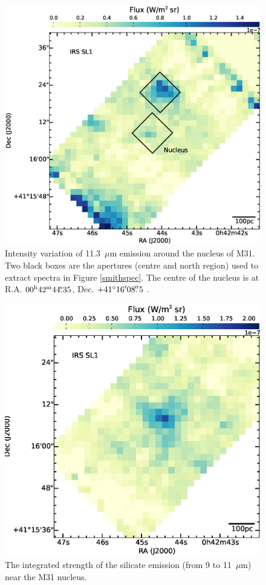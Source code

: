 \begin{figure}
\centering
\includegraphics[width = 8 cm]{./nuc11_3.eps}
\caption{ Intensity variation of 11.3~$\mu$m emission around the nucleus of M31. 
Two black boxes are the apertures (centre and north region) used to extract spectra in Figure \ref{smithspec}. 
The centre of the nucleus is at R.A. $00^{\rm h}42^{\rm m}44\fs35$, Dec. $+41\hbox{$^\circ$}16\hbox{$^\prime$}08\hbox{$.\!\!^{\prime\prime}$}5$ \citep{NucleusREF}.}
\label{nuc11}
\end{figure}

\begin{figure}
\centering
\includegraphics[scale = 0.3]{./NUCsilicate.eps}
\caption{The integrated strength of the silicate emission (from 9 to 11~$\mu$m) near the M31 nucleus.}
\label{silicate}
\end{figure}



